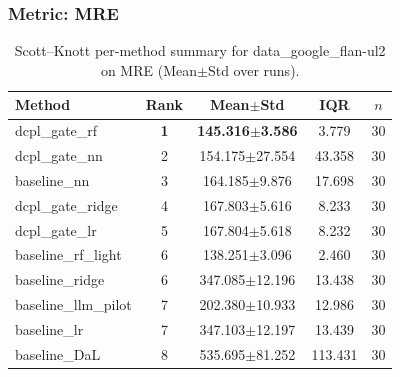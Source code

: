 \subsubsection*{Metric: MRE}
\begin{table}[H]
\centering
\scriptsize
\setlength{\tabcolsep}{4pt}
\renewcommand{\arraystretch}{1.1}
\caption{Scott--Knott per-method summary for data\_google\_flan-ul2 on MRE (Mean$\pm$Std over runs).}
\label{tab:sk_data_google_flan-ul2_MRE}
\begin{tabular}{l|c|c|c|c}
\hline
\textbf{Method} & \textbf{Rank} & \textbf{Mean$\pm$Std} & \textbf{IQR} & \textbf{$n$} \\
\hline
\rowcolor{red!15} dcpl\_gate\_rf & \textbf{1} & \textbf{145.316$\pm$3.586} & 3.779 & 30 \\
dcpl\_gate\_nn & 2 & 154.175$\pm$27.554 & 43.358 & 30 \\
baseline\_nn & 3 & 164.185$\pm$9.876 & 17.698 & 30 \\
dcpl\_gate\_ridge & 4 & 167.803$\pm$5.616 & 8.233 & 30 \\
dcpl\_gate\_lr & 5 & 167.804$\pm$5.618 & 8.232 & 30 \\
baseline\_rf\_light & 6 & 138.251$\pm$3.096 & 2.460 & 30 \\
baseline\_ridge & 6 & 347.085$\pm$12.196 & 13.438 & 30 \\
baseline\_llm\_pilot & 7 & 202.380$\pm$10.933 & 12.986 & 30 \\
baseline\_lr & 7 & 347.103$\pm$12.197 & 13.439 & 30 \\
baseline\_DaL & 8 & 535.695$\pm$81.252 & 113.431 & 30 \\
\hline
\end{tabular}
\end{table}
